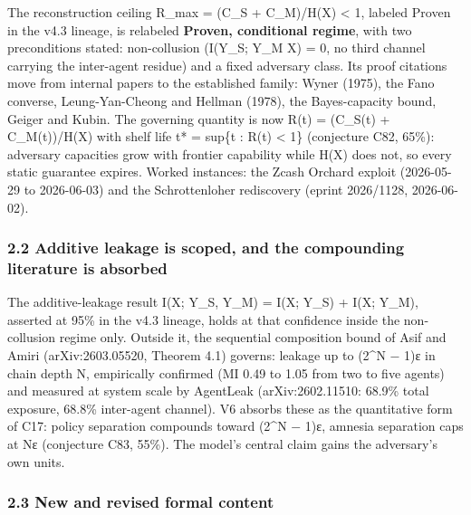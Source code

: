 \documentclass[
  11pt,
]{article}
\begin{document}
The reconstruction ceiling R\_max = (C\_S + C\_M)/H(X) \textless{} 1,
labeled Proven in the v4.3 lineage, is relabeled \textbf{Proven,
conditional regime}, with two preconditions stated: non-collusion
(I(Y\_S; Y\_M \textbar{} X) = 0, no third channel carrying the
inter-agent residue) and a fixed adversary class. Its proof citations
move from internal papers to the established family: Wyner (1975), the
Fano converse, Leung-Yan-Cheong and Hellman (1978), the Bayes-capacity
bound, Geiger and Kubin. The governing quantity is now R(t) = (C\_S(t) +
C\_M(t))/H(X) with shelf life t* = sup\{t : R(t) \textless{} 1\}
(conjecture C82, 65\%): adversary capacities grow with frontier
capability while H(X) does not, so every static guarantee expires.
Worked instances: the Zcash Orchard exploit (2026-05-29 to 2026-06-03)
and the Schrottenloher rediscovery (eprint 2026/1128, 2026-06-02).

\subsubsection{2.2 Additive leakage is scoped, and the compounding
literature is
absorbed}\label{additive-leakage-is-scoped-and-the-compounding-literature-is-absorbed}

The additive-leakage result I(X; Y\_S, Y\_M) = I(X; Y\_S) + I(X; Y\_M),
asserted at 95\% in the v4.3 lineage, holds at that confidence inside
the non-collusion regime only. Outside it, the sequential composition
bound of Asif and Amiri (arXiv:2603.05520, Theorem 4.1) governs: leakage
up to (2\^{}N − 1)ε in chain depth N, empirically confirmed (MI 0.49 to
1.05 from two to five agents) and measured at system scale by AgentLeak
(arXiv:2602.11510: 68.9\% total exposure, 68.8\% inter-agent channel).
V6 absorbs these as the quantitative form of C17: policy separation
compounds toward (2\^{}N − 1)ε, amnesia separation caps at Nε
(conjecture C83, 55\%). The model's central claim gains the adversary's
own units.

\subsubsection{2.3 New and revised formal
content}\label{new-and-revised-formal-content}
\end{document}
